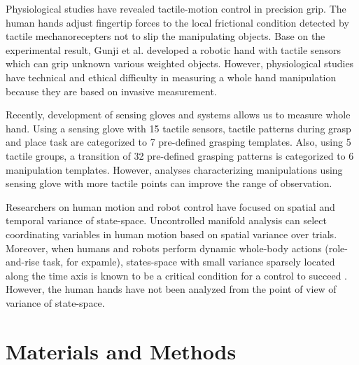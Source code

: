 \documentclass[letterpaper, 10 pt, conference]{IEEEtran}  %
\begin{document}
Physiological studies have revealed tactile-motion control in precision grip. The human hands adjust fingertip forces to the local frictional condition detected by tactile mechanorecepters not to slip the manipulating objects\cite{SensorimotorControlOfManipulationJohansson}. Base on the experimental result, Gunji et al. developed a robotic hand with tactile sensors which can grip unknown various weighted objects\cite{slipandgrip}. However, physiological studies have technical and ethical difficulty in measuring a whole hand manipulation because they are based on invasive measurement.

Recently, development of sensing gloves and systems allows us to measure whole hand. Using a sensing glove with 15 tactile sensors, tactile patterns during grasp and place task are categorized to 7 pre-defined grasping templates\cite{Faria}. Also, using 5 tactile groups, a transition of 32 pre-defined grasping patterns is categorized to 6 manipulation templates\cite{Kondo}. However, analyses characterizing manipulations using sensing glove with more tactile points can improve the range of observation. 

Researchers on human motion and robot control have focused on spatial and temporal variance of state-space. Uncontrolled manifold analysis can select coordinating variables in human motion based on spatial variance over trials\cite{nonaka2013motor}. Moreover, when humans and robots perform dynamic whole-body actions (role-and-rise task, for expamle), states-space with small variance sparsely located along the time axis is known to be a critical condition for a control to succeed \cite{kuniyoshi2007emergence}. However, the human hands have not been analyzed from the point of view of variance of state-space.


\section{Materials and Methods}
\end{document}
